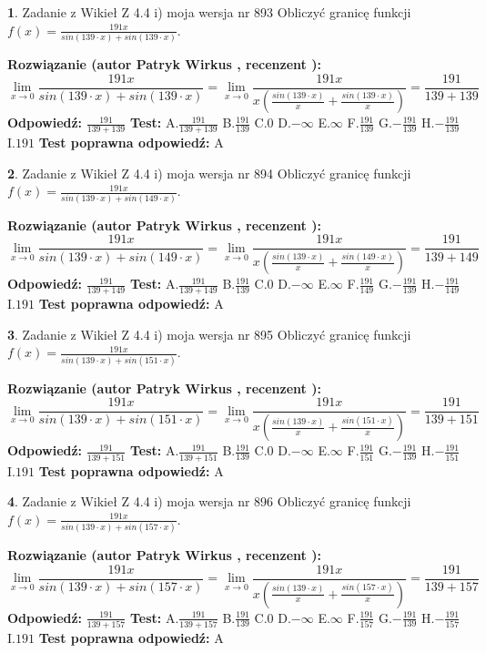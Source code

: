 \documentclass[12pt, a4paper]{article}
\theoremstyle{definition} %
\newtheorem{zad}{}
\newcommand{\zadStart}[1]{\begin{zad}#1\newline}
\newcommand{\zadStop}{\end{zad}}
\newcommand{\rozwStart}[2]{\noindent \textbf{Rozwiązanie (autor #1 , recenzent #2): }\newline}
\newcommand{\rozwStop}{\newline}
\newcommand{\odpStart}{\noindent \textbf{Odpowiedź:}\newline}
\newcommand{\odpStop}{\newline}
\newcommand{\testStart}{\noindent \textbf{Test:}\newline}
\newcommand{\testStop}{\newline}
\newcommand{\kluczStart}{\noindent \textbf{Test poprawna odpowiedź:}\newline}
\newcommand{\kluczStop}{\newline}
\begin{document}
\zadStart{Zadanie z Wikieł Z 4.4 i) moja wersja nr 893}
Obliczyć granicę funkcji $f(x)=\frac{191x}{sin(139\cdot x) +sin(139\cdot x)}$.
\zadStop
\rozwStart{Patryk Wirkus}{}
$$\lim\limits_{x\to 0}\frac{191x}{sin(139\cdot x) +sin(139\cdot x)}=\lim\limits_{x\to 0}\frac{191x}{x(\frac{sin(139\cdot x)}{x}+\frac{sin(139\cdot x)}{x})}=\frac{191}{139+139}$$
\rozwStop
\odpStart
$\frac{191}{139+139}$
\odpStop
\testStart
A.$\frac{191}{139+139}$
B.$\frac{191}{139}$
C.$0$
D.$-\infty$
E.$\infty$
F.$\frac{191}{139}$
G.$-\frac{191}{139}$
H.$-\frac{191}{139}$
I.$191$
\testStop
\kluczStart
A
\kluczStop



\zadStart{Zadanie z Wikieł Z 4.4 i) moja wersja nr 894}
Obliczyć granicę funkcji $f(x)=\frac{191x}{sin(139\cdot x) +sin(149\cdot x)}$.
\zadStop
\rozwStart{Patryk Wirkus}{}
$$\lim\limits_{x\to 0}\frac{191x}{sin(139\cdot x) +sin(149\cdot x)}=\lim\limits_{x\to 0}\frac{191x}{x(\frac{sin(139\cdot x)}{x}+\frac{sin(149\cdot x)}{x})}=\frac{191}{139+149}$$
\rozwStop
\odpStart
$\frac{191}{139+149}$
\odpStop
\testStart
A.$\frac{191}{139+149}$
B.$\frac{191}{139}$
C.$0$
D.$-\infty$
E.$\infty$
F.$\frac{191}{149}$
G.$-\frac{191}{139}$
H.$-\frac{191}{149}$
I.$191$
\testStop
\kluczStart
A
\kluczStop



\zadStart{Zadanie z Wikieł Z 4.4 i) moja wersja nr 895}
Obliczyć granicę funkcji $f(x)=\frac{191x}{sin(139\cdot x) +sin(151\cdot x)}$.
\zadStop
\rozwStart{Patryk Wirkus}{}
$$\lim\limits_{x\to 0}\frac{191x}{sin(139\cdot x) +sin(151\cdot x)}=\lim\limits_{x\to 0}\frac{191x}{x(\frac{sin(139\cdot x)}{x}+\frac{sin(151\cdot x)}{x})}=\frac{191}{139+151}$$
\rozwStop
\odpStart
$\frac{191}{139+151}$
\odpStop
\testStart
A.$\frac{191}{139+151}$
B.$\frac{191}{139}$
C.$0$
D.$-\infty$
E.$\infty$
F.$\frac{191}{151}$
G.$-\frac{191}{139}$
H.$-\frac{191}{151}$
I.$191$
\testStop
\kluczStart
A
\kluczStop



\zadStart{Zadanie z Wikieł Z 4.4 i) moja wersja nr 896}
Obliczyć granicę funkcji $f(x)=\frac{191x}{sin(139\cdot x) +sin(157\cdot x)}$.
\zadStop
\rozwStart{Patryk Wirkus}{}
$$\lim\limits_{x\to 0}\frac{191x}{sin(139\cdot x) +sin(157\cdot x)}=\lim\limits_{x\to 0}\frac{191x}{x(\frac{sin(139\cdot x)}{x}+\frac{sin(157\cdot x)}{x})}=\frac{191}{139+157}$$
\rozwStop
\odpStart
$\frac{191}{139+157}$
\odpStop
\testStart
A.$\frac{191}{139+157}$
B.$\frac{191}{139}$
C.$0$
D.$-\infty$
E.$\infty$
F.$\frac{191}{157}$
G.$-\frac{191}{139}$
H.$-\frac{191}{157}$
I.$191$
\testStop
\kluczStart
A
\kluczStop
\end{document}

